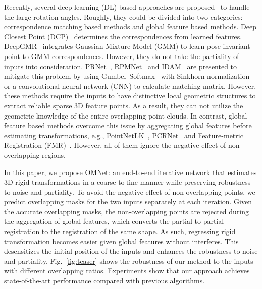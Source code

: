 \documentclass[10pt,twocolumn,letterpaper]{article}
\begin{document}
Recently, several deep learning (DL) based approaches are proposed~\cite{wang2019deep,aoki2019pointnetlk, wang2019prnet, sarode2019pcrnet, yew2020-RPMNet, huang2020feature, idam, yuan2020deepgmr} to handle the large rotation angles. Roughly, they could be divided into two categories: correspondence matching based methods and global feature based methods. Deep Closest Point (DCP)~\cite{wang2019deep} determines the correspondences from learned features. DeepGMR~\cite{yuan2020deepgmr} integrates Gaussian Mixture Model (GMM) to learn pose-invariant point-to-GMM correspondences. However, they do not take the partiality of inputs into consideration. PRNet~\cite{wang2019prnet}, RPMNet~\cite{yew2020-RPMNet} and IDAM~\cite{idam} are presented to mitigate this problem by using Gumbel–Softmax~\cite{jang2016categorical} with Sinkhorn normalization~\cite{sinkhorn1964relationship} or a convolutional neural network (CNN) to calculate matching matrix. However, these methods require the inputs to have distinctive local geometric structures to extract reliable sparse 3D feature points. As a result, they can not utilize the geometric knowledge of the entire overlapping point clouds. In contrast, global feature based methods overcome this issue by aggregating global features before estimating transformations, e.g., PointNetLK~\cite{aoki2019pointnetlk}, PCRNet~\cite{sarode2019pcrnet} and Feature-metric Registration (FMR)~\cite{huang2020feature}. However, all of them ignore the negative effect of non-overlapping regions.

In this paper, we propose OMNet: an end-to-end iterative network that estimates 3D rigid transformations in a coarse-to-fine manner while preserving robustness to noise and partiality. To avoid the negative effect of non-overlapping points, we predict overlapping masks for the two inputs separately at each iteration. Given the accurate overlapping masks, the non-overlapping points are rejected during the aggregation of global features, which converts the partial-to-partial registration to the registration of the same shape. As such, regressing rigid transformation becomes easier given global features without interferes. This desensitizes the initial position of the inputs and enhances the robustness to noise and partiality. Fig.~\ref{fig:teaser} shows the robustness of our method to the inputs with different overlapping ratios. Experiments show that our approach achieves state-of-the-art performance compared with previous algorithms.
\end{document}
